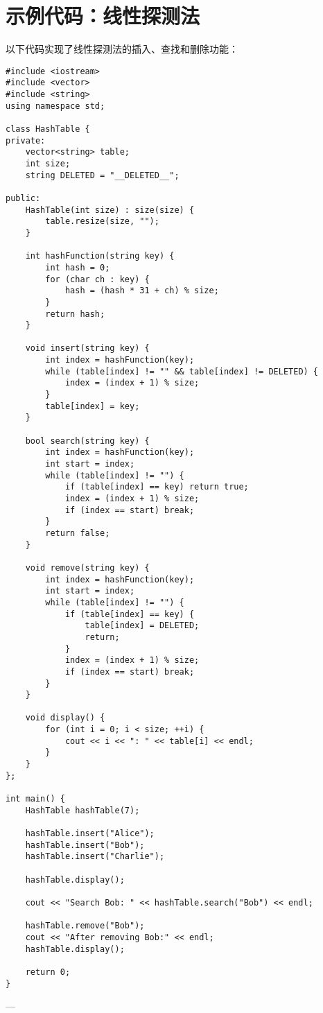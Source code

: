 \documentclass[a4paper,12pt]{article}
\begin{document}
\section{示例代码：线性探测法}
以下代码实现了线性探测法的插入、查找和删除功能：
\begin{lstlisting}[caption=基于线性探测法的哈希表实现]
#include <iostream>
#include <vector>
#include <string>
using namespace std;

class HashTable {
private:
    vector<string> table;
    int size;
    string DELETED = "__DELETED__";

public:
    HashTable(int size) : size(size) {
        table.resize(size, "");
    }

    int hashFunction(string key) {
        int hash = 0;
        for (char ch : key) {
            hash = (hash * 31 + ch) % size;
        }
        return hash;
    }

    void insert(string key) {
        int index = hashFunction(key);
        while (table[index] != "" && table[index] != DELETED) {
            index = (index + 1) % size; 
        }
        table[index] = key;
    }

    bool search(string key) {
        int index = hashFunction(key);
        int start = index;
        while (table[index] != "") {
            if (table[index] == key) return true;
            index = (index + 1) % size;
            if (index == start) break; 
        }
        return false;
    }

    void remove(string key) {
        int index = hashFunction(key);
        int start = index;
        while (table[index] != "") {
            if (table[index] == key) {
                table[index] = DELETED;
                return;
            }
            index = (index + 1) % size;
            if (index == start) break;
        }
    }

    void display() {
        for (int i = 0; i < size; ++i) {
            cout << i << ": " << table[i] << endl;
        }
    }
};

int main() {
    HashTable hashTable(7);

    hashTable.insert("Alice");
    hashTable.insert("Bob");
    hashTable.insert("Charlie");

    hashTable.display();

    cout << "Search Bob: " << hashTable.search("Bob") << endl;

    hashTable.remove("Bob");
    cout << "After removing Bob:" << endl;
    hashTable.display();

    return 0;
}
\end{lstlisting}

---
\end{document}
